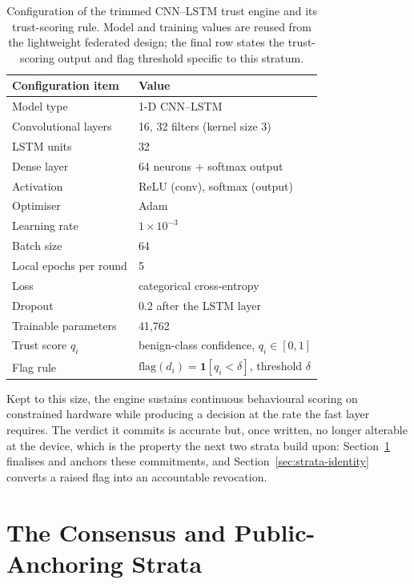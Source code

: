 \begin{table}[!htbp]
  \centering
  \footnotesize
  \setlength{\tabcolsep}{6pt}
  \renewcommand{\arraystretch}{1.25}
  \caption{Configuration of the trimmed CNN--LSTM trust engine and its trust-scoring rule. Model and training values are reused from the lightweight federated design; the final row states the trust-scoring output and flag threshold specific to this stratum.}
  \label{tab:strata-hyper}
  \begin{tabular}{@{}ll@{}}
    \toprule
    \textbf{Configuration item} & \textbf{Value} \\
    \midrule
    Model type              & 1-D CNN--LSTM \\
    Convolutional layers    & 16, 32 filters (kernel size 3) \\
    LSTM units              & 32 \\
    Dense layer             & 64 neurons + softmax output \\
    Activation              & ReLU (conv), softmax (output) \\
    Optimiser               & Adam \\
    Learning rate           & $1\times10^{-3}$ \\
    Batch size              & 64 \\
    Local epochs per round  & 5 \\
    Loss                    & categorical cross-entropy \\
    Dropout                 & 0.2 after the LSTM layer \\
    Trainable parameters    & 41{,}762 \\
    \addlinespace
    Trust score $q_i$    & benign-class confidence, $q_i\in[0,1]$ \\
    Flag rule               & $\text{flag}(d_i)=\mathbf{1}[q_i<\delta]$, threshold $\delta$ \\
    \bottomrule
  \end{tabular}
\end{table}
Kept to this size, the engine sustains continuous behavioural scoring on constrained hardware while producing a decision at the rate the fast layer requires. The verdict it commits is accurate but, once written, no longer alterable at the device, which is the property the next two strata build upon: Section~\ref{sec:strata-anchor} finalises and anchors these commitments, and Section~\ref{sec:strata-identity} converts a raised flag into an accountable revocation.


\section{The Consensus and Public-Anchoring Strata}
\label{sec:strata-anchor}

